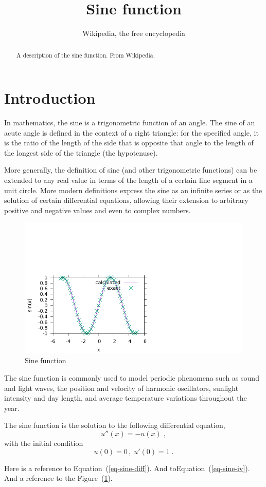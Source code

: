\documentclass[twocolumn]{article}
\begin{document}
\title{Sine function}
\author{Wikipedia, the free encyclopedia}
\date{}
\maketitle

\begin{abstract}
A description of the sine function. From Wikipedia.
\end{abstract}

\section{Introduction}
In mathematics, the sine is a trigonometric function of an angle. The
sine of an acute angle is defined in the context of a right triangle:
for the specified angle, it is the ratio of the length of the side that
is opposite that angle to the length of the longest side of the triangle
(the hypotenuse).

More generally, the definition of sine (and other trigonometric functions)
can be extended to any real value in terms of the length of a certain line
segment in a unit circle. More modern definitions express the sine as an
infinite series or as the solution of certain differential equations,
allowing their extension to arbitrary positive and negative values and
even to complex numbers.

\begin{figure}[b]
\includegraphics{plot.pdf}
\caption{Sine function}
\label{fig-sine}
\end{figure}

The sine function is commonly used to model periodic phenomena such as
sound and light waves, the position and velocity of harmonic oscillators,
sunlight intensity and day length, and average temperature variations
throughout the year.

The sine function is the solution to the following differential equation,
\begin{equation}
u''(x) = -u(x) \;,
\label{eq-sine-diff}
\end{equation}
with the initial condition
\begin{equation}
u(0)=0 \,,\; u'(0)=1 \;.
\label{eq-sine-iv}
\end{equation}

Here is a reference to Equation~(\ref{eq-sine-diff}). And
toEquation~(\ref{eq-sine-iv}). And a reference to the
Figure~(\ref{fig-sine}).
\end{document}
